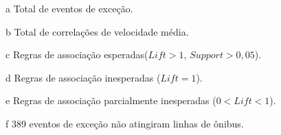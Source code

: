 \documentclass[
	12pt,				%
	oneside,			%
	a4paper,			%
	english,			%
	brazil				%
	]{abntex2ppgsi}
\begin{document}
{{{\begin{apendicesenv}
\begin{table}[!htb]
\begin{threeparttable}
\begin{tablenotes}
            \item[a] Total de eventos de exceção.
            \item[b] Total de correlações de velocidade média.
            \item[c] Regras de associação esperadas($Lift > 1$, $Support > 0,05$).
            \item[d] Regras de associação inesperadas ($Lift = 1$).
            \item[e] Regras de associação parcialmente inesperadas ($0 < Lift < 1$).
            \item[f] 389 eventos de exceção não atingiram linhas de ônibus.
        \end{tablenotes}
\end{threeparttable}
\end{table}


\end{apendicesenv}}}}
\end{document}
